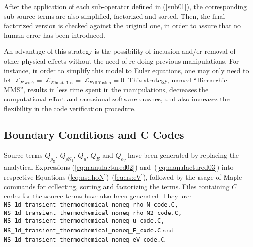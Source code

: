 \documentclass[10pt]{article}
\newcommand{\Lo}{\,\mathcal{L}}
\newcommand{\diffusion}{\,\text{diffusion}}
\newcommand{\work}{\,\text{work}}
\newcommand{\heatflux}{\,\text{heat flux}}
\begin{document}
After the application of each sub-operator defined in (\ref{sub01}), the corresponding sub-source terms are also simplified, factorized and sorted. Then, the final factorized version is checked against the original one, in order to assure that no human error has been introduced.

An advantage of this strategy is the possibility of inclusion and/or removal of other physical effects without the need of re-doing previous manipulations. For instance, in order to simplify this model to Euler equations, one may only need to let $\Lo_{E \work} =\Lo_{E \heatflux}= \Lo_{E \diffusion}=0$. This strategy, named ``Hierarchic MMS'', results in less time spent in the manipulations, decreases the computational effort and occasional software crashes, and also increases the flexibility in the code verification procedure.




\subsection{Boundary Conditions and C Codes}

Source terms $Q_{\rho_\text{N} }$, $Q_{\rho \text{N}_{2}}$, $Q_u$, $Q_E$ and $Q_{e_V}$ have been generated by replacing the analytical Expressions (\ref{eq:manufactured02}) and~(\ref{eq:manufactured03}) into respective Equations (\ref{eq:ns:rhoN})--(\ref{eq:ns:eV}), followed by the usage of Maple commands for collecting, sorting and factorizing the terms. Files containing $C$ codes for the source terms have also been generated. They are: 
\texttt{NS\_1d\_transient\_thermochemical\_noneq\_rho\_N\_code.C, \\
NS\_1d\_transient\_thermochemical\_noneq\_rho\_N2\_code.C,\\ 
NS\_1d\_transient\_thermochemical\_noneq\_u\_code.C, \\
NS\_1d\_transient\_thermochemical\_noneq\_E\_code.C} and \\
\texttt{NS\_1d\_transient\_thermochemical\_noneq\_eV\_code.C}.
\end{document}
